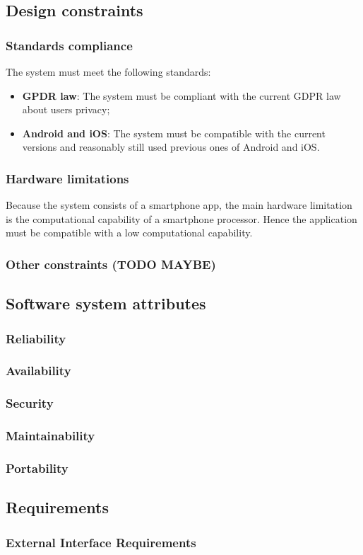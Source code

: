 \subsection{Design constraints}
\subsubsection{Standards compliance}
The system must meet the following standards:
\begin{itemize}
    \item \textbf{GPDR law}: The system must be compliant with the current GDPR law about users privacy;
    \item \textbf{Android and iOS}: The system must be compatible with the current versions and reasonably still used previous ones of Android and iOS.
\end{itemize}
\subsubsection{Hardware limitations}
Because the system consists of a smartphone app, the main hardware limitation is the computational capability of a smartphone processor. Hence the
application must be compatible with a low computational capability.
\subsubsection{Other constraints (TODO MAYBE)}

\subsection{Software system attributes}
\subsubsection{Reliability}
\subsubsection{Availability}
\subsubsection{Security}
\subsubsection{Maintainability}
\subsubsection{Portability}
\subsection{Requirements}
\subsubsection{External Interface Requirements}
\clearpage